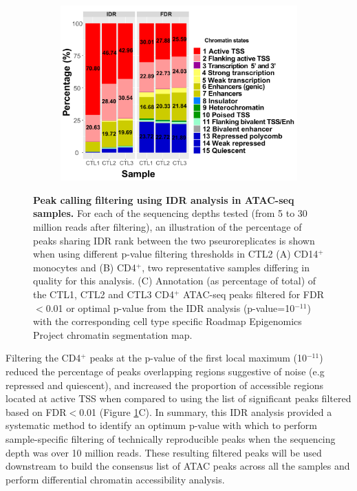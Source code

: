 \begin{figure}[htbp]
\begin{subfigure}{0.65\textwidth}
\includegraphics[width=\textwidth]{./Results1/pdfs/stacked_barplot_chromatin_states_percent_CD4_qval_vs_PVAL_IDR_filtered}
\caption{\textbf{}} %
\end{subfigure}%
\caption[Peak calling filtering using IDR analysis in ATAC-seq samples.]{\textbf{Peak calling filtering using IDR analysis in ATAC-seq samples.} For each of the sequencing depths tested (from 5 to 30 million reads after filtering), an illustration of the percentage of peaks sharing IDR rank between the two pseuroreplicates is shown when using different p-value filtering thresholds in CTL2 (A) CD14$^+$ monocytes and (B) CD4$^+$, two representative samples differing in quality for this analysis. (C) Annotation (as percentage of total) of the CTL1, CTL2 and CTL3 CD4$^+$ ATAC-seq peaks filtered for FDR$<$0.01 or optimal p-value from the IDR analysis (p-value=10$^{-11}$) with the corresponding cell type specific Roadmap Epigenomics Project chromatin segmentation map.}
\label{figure:Peak_calling_IDR_filtering_and_chrom_stated_ATAC}
\end{figure} 


Filtering the CD4$^+$ peaks at the p-value of the first local maximum (10$^{-11}$) reduced the percentage of peaks overlapping regions suggestive of noise (e.g repressed and quiescent), and increased the proportion of accessible regions located at active TSS when compared to using the list of significant peaks filtered based on FDR$<$0.01 (Figure \ref{figure:Peak_calling_IDR_filtering_and_chrom_stated_ATAC}C). In summary, this IDR analysis provided a systematic method to identify an optimum p-value with which to perform sample-specific filtering of technically reproducible peaks when the sequencing depth was over 10 million reads. These resulting filtered peaks will be used downstream to build the consensus list of ATAC peaks across all the samples and perform differential chromatin accessibility analysis. 

